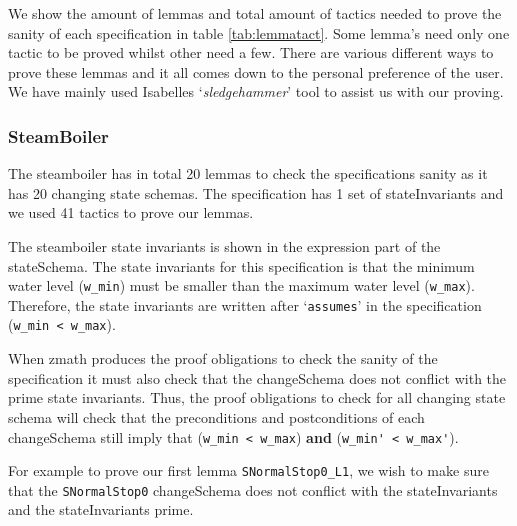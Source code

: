 We show the amount of lemmas and total amount of tactics needed to prove the
sanity of each specification in table \ref{tab:lemmatact}. Some lemma's need
only one tactic to be proved whilst other need a few. There are various
different ways to prove these lemmas and it all comes down to the personal
preference of the user. We have mainly used Isabelles `\emph{sledgehammer}' tool
to assist us with our proving.

\subsubsection{SteamBoiler}

The steamboiler has in total 20 lemmas to check the specifications sanity as it
has 20 changing state schemas. The specification has 1 set of stateInvariants
and we used 41 tactics to prove our lemmas.

The steamboiler state invariants is shown in the expression part of the
stateSchema. The state invariants for this specification is that the minimum
water level (\verb|w_min|) must be smaller than the maximum water level
(\verb|w_max|). Therefore, the state invariants are written after
`\texttt{assumes}' in the specification (\verb|w_min < w_max|). 

When \gls{zmath} produces the proof obligations to check the sanity of the
specification it must also check that the changeSchema does not conflict with
the prime state invariants. Thus, the proof obligations to check for all
changing state schema will check that the preconditions and postconditions of
each changeSchema still imply that (\verb|w_min < w_max|) \textbf{and}
(\verb|w_min' < w_max'|).

For example to prove our first lemma \verb|SNormalStop0_L1|, we wish to make
sure that the \verb|SNormalStop0| changeSchema does not conflict with the
stateInvariants and the stateInvariants prime.

